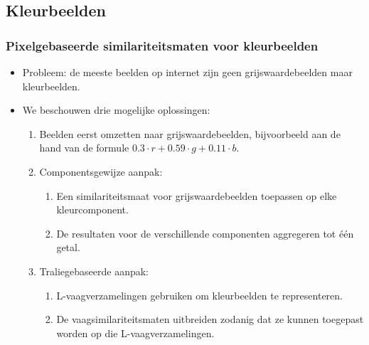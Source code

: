 \documentclass[dutch]{beamer}
\theoremstyle{definition}
\theoremstyle{remark}
\theoremstyle{example}
\begin{document}
\subsection{Kleurbeelden}
\frame
{
  \frametitle{Pixelgebaseerde similariteitsmaten voor kleurbeelden}
  
  \begin{itemize}
     \item Probleem: de meeste beelden op internet zijn 
     geen grijswaardebeelden maar kleurbeelden.
     \item We beschouwen drie mogelijke oplossingen:
     \begin{enumerate}
       \item Beelden eerst omzetten naar grijswaardebeelden, bijvoorbeeld aan de 
       hand van de formule $0.3 \cdot r + 0.59 \cdot g + 0.11 \cdot b$.
       \item Componentsgewijze aanpak:
       \begin{enumerate}
       \item Een similariteitsmaat voor grijswaardebeelden toepassen op elke
       kleurcomponent. 
       \item De resultaten voor de verschillende componenten
       aggregeren tot \'e\'en getal.
       \end{enumerate}
       \item Traliegebaseerde aanpak:
        \begin{enumerate}
          \item L-vaagverzamelingen gebruiken om kleurbeelden te representeren.
          \item De vaagsimilariteitsmaten uitbreiden zodanig dat ze kunnen
          toegepast worden op die L-vaagverzamelingen.
        \end{enumerate}
     \end{enumerate}
   \end{itemize}
}
% 
\end{document}
